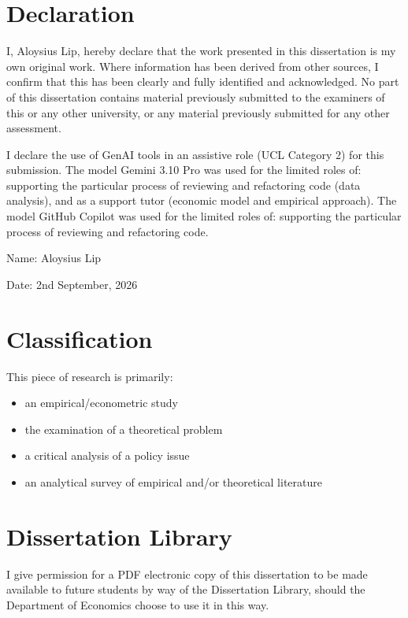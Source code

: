 \section*{Declaration}

I, Aloysius Lip, hereby declare that the work presented in this
dissertation is my own original work. Where information has been derived from
other sources, I confirm that this has been clearly and fully identified and
acknowledged. No part of this dissertation contains material previously
submitted to the examiners of this or any other university, or any material
previously submitted for any other assessment.
\par
I declare the use of GenAI tools in an assistive role (UCL Category 2) for this submission.
The model Gemini 3.10 Pro \citep{GoogleDeepMind} was used for the limited roles of:
supporting the particular process of reviewing and refactoring code (data analysis),
and as a support tutor (economic model and empirical approach).
The model GitHub Copilot \citep{Microsoft2026} was used for the limited roles of:
supporting the particular process of reviewing and refactoring code.

\medskip
Name: Aloysius Lip

\medskip
Date: 2nd September, 2026

\vspace{1cm}

\section*{Classification}

This piece of research is primarily:

\begin{itemize}[label=$\square$, leftmargin=2em, itemsep=2pt, topsep=0.5em]
    \item[$\checkmark$] an empirical/econometric study
    \item the examination of a theoretical problem
    \item a critical analysis of a policy issue
    \item an analytical survey of empirical and/or theoretical literature
\end{itemize}

\vspace{1cm}

\section*{Dissertation Library}

\begin{center}
I give permission for a PDF electronic copy of this dissertation to be made
available to future students by way of the Dissertation Library, should the
Department of Economics choose to use it in this way.
\end{center}